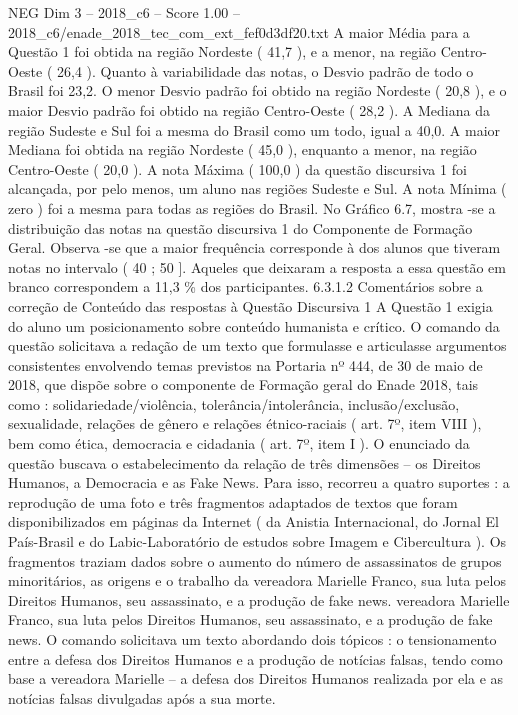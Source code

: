 \begin{textsample}{NEG Dim 3 – 2018\_c6 – Score 1.00 – 2018\_c6/enade\_2018\_tec\_com\_ext\_fef0d3df20.txt}
A maior Média para a Questão 1 foi obtida na região Nordeste ( 41,7 ), e a menor, na região Centro-Oeste ( 26,4 ).
Quanto à variabilidade das notas, o Desvio padrão de todo o Brasil foi 23,2.
O menor Desvio padrão foi obtido na região Nordeste ( 20,8 ), e o maior Desvio padrão foi obtido na região Centro-Oeste ( 28,2 ).
A Mediana da região Sudeste e Sul foi a mesma do Brasil como um todo, igual a 40,0.
A maior Mediana foi obtida na região Nordeste ( 45,0 ), enquanto a menor, na região Centro-Oeste ( 20,0 ).
A nota Máxima ( 100,0 ) da questão discursiva 1 foi alcançada, por pelo menos, um aluno nas regiões Sudeste e Sul.
A nota Mínima ( zero ) foi a mesma para todas as regiões do Brasil.
No Gráfico 6.7, mostra -se a distribuição das notas na questão discursiva 1 do Componente de Formação Geral.
Observa -se que a maior frequência corresponde à dos alunos que tiveram notas no intervalo ( 40 ; 50 ].
Aqueles que deixaram a resposta a essa questão em branco correspondem a 11,3 \% dos participantes. 6.3.1.2 Comentários sobre a correção de Conteúdo das respostas à Questão Discursiva 1 A Questão 1 exigia do aluno um posicionamento sobre conteúdo humanista e crítico.
O comando da questão solicitava a redação de um texto que formulasse e articulasse argumentos consistentes envolvendo temas previstos na Portaria nº 444, de 30 de maio de 2018, que dispõe sobre o componente de Formação geral do Enade 2018, tais como : solidariedade/violência, tolerância/intolerância, inclusão/exclusão, sexualidade, relações de gênero e relações étnico-raciais ( art. 7º, item VIII ), bem como ética, democracia e cidadania ( art. 7º, item I ).
O enunciado da questão buscava o estabelecimento da relação de três dimensões – os Direitos Humanos, a Democracia e as Fake News.
Para isso, recorreu a quatro suportes : a reprodução de uma foto e três fragmentos adaptados de textos que foram disponibilizados em páginas da Internet ( da Anistia Internacional, do Jornal El País-Brasil e do Labic-Laboratório de estudos sobre Imagem e Cibercultura ).
Os fragmentos traziam dados sobre o aumento do número de assassinatos de grupos minoritários, as origens e o trabalho da vereadora Marielle Franco, sua luta pelos Direitos Humanos, seu assassinato, e a produção de fake news. vereadora Marielle Franco, sua luta pelos Direitos Humanos, seu assassinato, e a produção de fake news.
O comando solicitava um texto abordando dois tópicos : o tensionamento entre a defesa dos Direitos Humanos e a produção de notícias falsas, tendo como base a vereadora Marielle – a defesa dos Direitos Humanos realizada por ela e as notícias falsas divulgadas após a sua morte.

\end{textsample}
